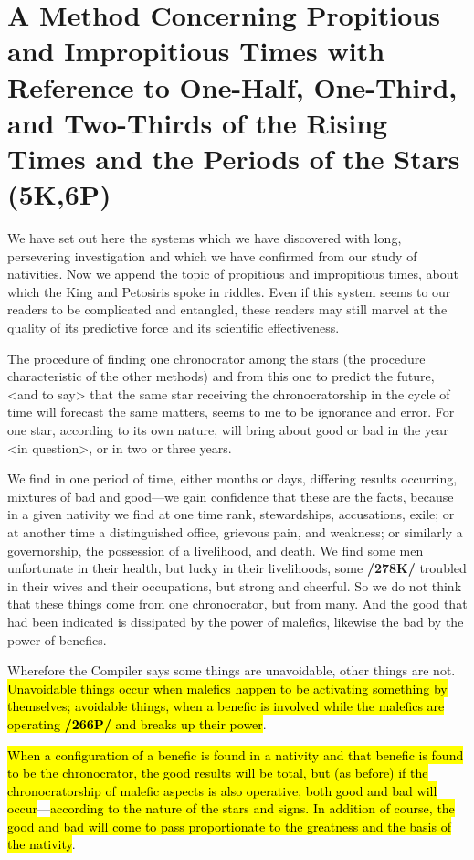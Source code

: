 \section{A Method Concerning Propitious and Impropitious Times with Reference to One-Half, One-Third, and Two-Thirds of the Rising Times and the Periods of the Stars (5K,6P)}

We have set out here the systems which we have discovered with long, persevering investigation and which we have confirmed from our study of nativities. Now we append the topic of propitious and
impropitious times, about which the King and Petosiris spoke in riddles. Even if this system seems to our readers to be complicated and entangled, these readers may still marvel at the quality of its predictive force and its scientific effectiveness. 

The  procedure of finding one chronocrator among the stars (the procedure characteristic of the other methods) and from this one to predict the future, <and to say> that the same star receiving the chronocratorship in the cycle of time will forecast the same matters, seems to me to be ignorance and error. For one star, according to its own nature, will bring about good or bad in the year <in question>, or in two or three years. 

We find in one period of time, either months or days, differing results occurring, mixtures of bad and good—we gain confidence that these are the facts, because in a given nativity we find at one time rank, stewardships, accusations, exile; or at another time a distinguished office, grievous pain, and weakness; or similarly a governorship, the possession of a livelihood, and death. We find some men unfortunate in their health, but lucky in their livelihoods, some \textbf{/278K/} troubled in their wives and their occupations, but strong and cheerful. So we do not think that these things come from one chronocrator, but from many. And the good that had been indicated is dissipated by the power of malefics, likewise the bad by the power of benefics.

Wherefore the Compiler says some things are unavoidable, other things are not. \hl{Unavoidable things occur when malefics happen to be activating something by themselves; avoidable things, when a benefic is involved while the malefics are operating \textbf{/266P/} and breaks up their power}. 

\hl{When a configuration of a benefic is found in a nativity and that benefic is found to be the chronocrator, the good results will be total,
but (as before) if the chronocratorship of malefic aspects is also operative, both good and bad will occur}—\hl{according to the nature of the stars and signs. In addition of course, the good and bad will come to pass proportionate to the greatness and the basis of the nativity}.

